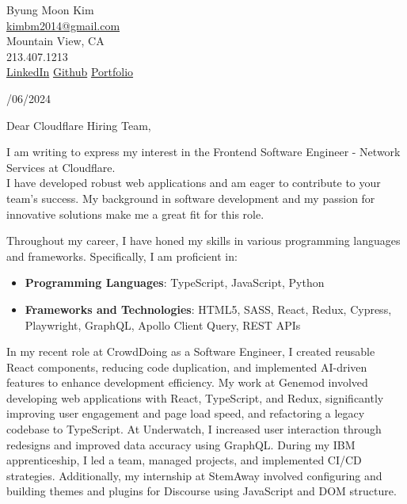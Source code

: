 \documentclass[10pt]{article}
\begin{document}
\begin{flushright}
	Byung Moon Kim \\
	\href{mailto:kimbm2014@gmail.com}{kimbm2014@gmail.com} \\
	Mountain View, CA \\
	213.407.1213 \\
	\hspace{0.1ex} \href{https://www.linkedin.com/in/ray-kim0727/}{LinkedIn}\hspace{1.0ex}
	\hspace{0.1ex} \href{https://github.com/moonnada}{Github}\hspace{1.0ex}
	\hspace{0.1ex} \href{https://raykim0727.vercel.app/}{Portfolio}\hspace{1.0ex}
\end{flushright}

\vspace{1cm}

/06/2024

\vspace{1cm}

\noindent Dear Cloudflare Hiring Team,

\vspace{0.5cm}

I am writing to express my interest in the Frontend Software Engineer - Network Services at Cloudflare.\\ I have developed robust web applications and am eager to contribute to your team’s success. My background in software development and my passion for innovative solutions make me a great fit for this role.
\vspace{0.5cm}

Throughout my career, I have honed my skills in various programming languages and frameworks. Specifically, I am proficient in:

\begin{itemize}[leftmargin=*]
    \item \textbf{Programming Languages}: TypeScript, JavaScript, Python
    \item \textbf{Frameworks and Technologies}: HTML5, SASS, React, Redux, Cypress, Playwright, GraphQL, Apollo Client Query, REST APIs
\end{itemize}

In my recent role at CrowdDoing as a Software Engineer, I created reusable React components, reducing code duplication, and implemented AI-driven features to enhance development efficiency. My work at Genemod involved developing web applications with React, TypeScript, and Redux, significantly improving user engagement and page load speed, and refactoring a legacy codebase to TypeScript. At Underwatch, I increased user interaction through redesigns and improved data accuracy using GraphQL. During my IBM apprenticeship, I led a team, managed projects, and implemented CI/CD strategies. Additionally, my internship at StemAway involved configuring and building themes and plugins for Discourse using JavaScript and DOM structure.
\vspace{0.5cm}
\end{document}
